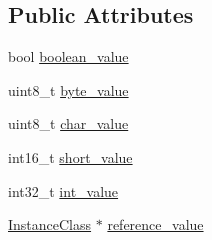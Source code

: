 \subsection*{Public Attributes}
\begin{DoxyCompactItemize}
\item 
bool \hyperlink{unionlocal__var__value__u_a505f55d965d3166fd656c015541b5058}{boolean\+\_\+value}
\item 
uint8\+\_\+t \hyperlink{unionlocal__var__value__u_aa7f181e30d20b090a62375ff58252e5e}{byte\+\_\+value}
\item 
uint8\+\_\+t \hyperlink{unionlocal__var__value__u_a7607fa3be1d65b6c4edc1d350144c4a3}{char\+\_\+value}
\item 
int16\+\_\+t \hyperlink{unionlocal__var__value__u_ae5207df7130db21c87531c1fcdd331d4}{short\+\_\+value}
\item 
int32\+\_\+t \hyperlink{unionlocal__var__value__u_a3d2c83971643d224cbc92c304a5006d4}{int\+\_\+value}
\item 
\hyperlink{heap_8hpp_a10a6b663306bb9ebfa5959ab91c79eda}{Instance\+Class} $\ast$ \hyperlink{unionlocal__var__value__u_a90faf60bf18d81fb6caa6fbe26eca949}{reference\+\_\+value}
\end{DoxyCompactItemize}


